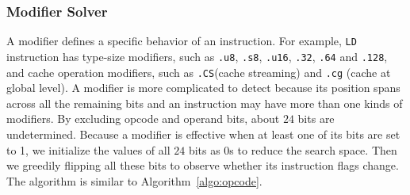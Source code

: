 

\subsubsection{Modifier Solver}

A modifier defines a specific behavior of an instruction. 
For example, {\tt LD} instruction has type-size modifiers, such as {\tt .u8}, {\tt .s8}, {\tt .u16}, {\tt .32}, {\tt .64} and {\tt .128}, and cache operation modifiers, such as {\tt .CS}(cache streaming) and {\tt .cg} (cache at global level). 
A modifier is more complicated to detect because its position spans across all the remaining bits and an instruction may have more than one kinds of modifiers. 
By excluding opcode and operand bits, about $24$ bits are undetermined. 
Because a modifier is effective when at least one of its bits are set to 1, we initialize the values of all $24$ bits as $0$s to reduce the search space.
Then we greedily flipping all these bits to observe whether its instruction flags change.
The algorithm is similar to Algorithm~\ref{algo:opcode}.

